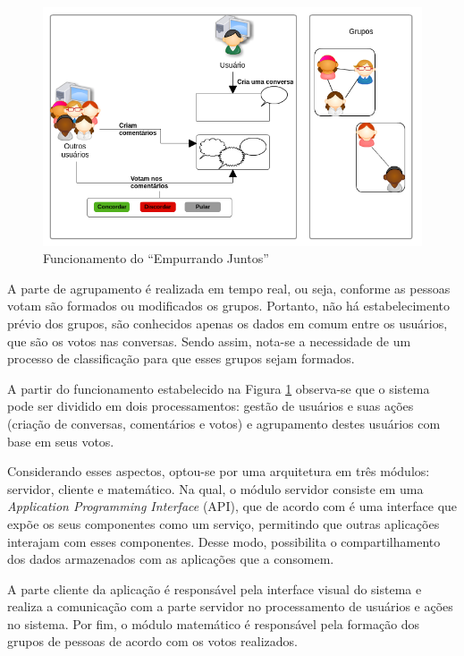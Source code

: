 \begin{figure}[h!]
\centering
\includegraphics[scale=0.6]{figuras/resumo_ej.png}
\caption{Funcionamento do ``Empurrando Juntos''}
\label{fig:resumo_ej}
\end{figure}
% 
A parte de agrupamento é realizada em tempo real, ou seja, conforme as pessoas votam são formados ou modificados os grupos. 
Portanto, não há estabelecimento prévio dos grupos, são conhecidos apenas os dados em comum entre os usuários, que são os votos nas conversas. 
Sendo assim, nota-se a necessidade de um processo de classificação para que esses grupos sejam formados.

A partir do funcionamento estabelecido na Figura \ref{fig:resumo_ej} observa-se que o sistema pode ser dividido em dois processamentos: gestão de usuários 
e suas ações (criação de conversas, comentários e votos) e agrupamento destes usuários com base em seus votos.

Considerando esses aspectos, optou-se por uma arquitetura em três módulos: servidor, cliente e matemático. Na qual, o módulo servidor 
consiste em uma \textit{Application Programming Interface} (API), que de acordo com 
é uma interface que expõe os seus componentes como um serviço, permitindo que outras aplicações interajam com esses 
componentes. Desse modo, possibilita o compartilhamento dos dados armazenados com as aplicações que a consomem.

A parte cliente da aplicação é responsável pela interface visual do sistema e realiza a comunicação com a parte servidor no processamento
de usuários e ações no sistema. Por fim, o módulo matemático é responsável pela formação dos grupos de pessoas de acordo com os votos realizados.

